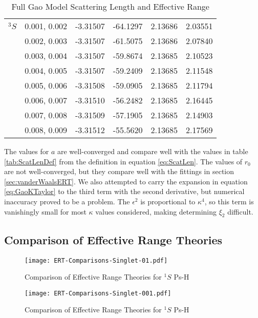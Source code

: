 \documentclass[Dissertation.tex]{subfiles}
\begin{document}
\begin{table}[H]
\begin{tabular}{c c c c c c}
\midrule
$^3S$ & 0.001, 0.002 & -3.31507 & -64.1297 & 2.13686 & 2.03551 \\
 & 0.002, 0.003 & -3.31507 & -61.5075 & 2.13686 & 2.07840 \\
 & 0.003, 0.004 & -3.31507 & -59.8674 & 2.13685 & 2.10523 \\
 & 0.004, 0.005 & -3.31507 & -59.2409 & 2.13685 & 2.11548 \\
 & 0.005, 0.006 & -3.31508 & -59.0905 & 2.13685 & 2.11794 \\
 & 0.006, 0.007 & -3.31510 & -56.2482 & 2.13685 & 2.16445 \\
 & 0.007, 0.008 & -3.31509 & -57.1905 & 2.13685 & 2.14903 \\
 & 0.008, 0.009 & -3.31512 & -55.5620 & 2.13685 & 2.17569 \\
\bottomrule
\bottomrule
\end{tabular}
\caption{Full Gao Model Scattering Length and Effective Range}
\label{tab:GaoResults}
\end{table}

The values for $a$ are well-converged and compare well with the values in table \ref{tab:ScatLenDef} from the definition in equation \ref{eq:ScatLen}. The values of $r_0$ are not well-converged, but they compare well with the fittings in section \ref{sec:vanderWaalsERT}. We also attempted to carry the expansion in equation \ref{eq:GaoKTaylor} to the third term with the second derivative, but numerical inaccuracy proved to be a problem. The $\epsilon^2$ is proportional to $\kappa^4$, so this term is vanishingly small for most $\kappa$ values considered, making determining $\xi_2$ difficult.


\subsection{Comparison of Effective Range Theories}

\begin{figure}[H]
	\centering
	\texttt{[image: ERT-Comparisons-Singlet-01.pdf]}
	\caption{Comparison of Effective Range Theories for $^1S$ Ps-H}
	\label{fig:ERT-Comparisons-Singlet-01}
\end{figure}

\begin{figure}[H]
	\centering
	\texttt{[image: ERT-Comparisons-Singlet-001.pdf]}
	\caption{Comparison of Effective Range Theories for $^1S$ Ps-H}
	\label{fig:ERT-Comparisons-Singlet-001}
\end{figure}
\end{document}
